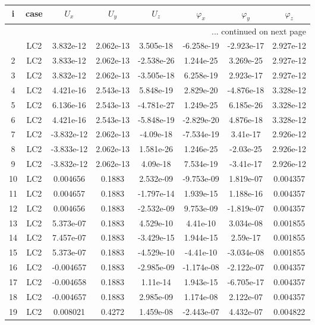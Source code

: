 \documentclass{article}%
\begin{document}
\begin{longtable}{| c c | c c c c c c |}%
\hline%
i&case&$U_x$&$U_y$&$U_z$&$\varphi_x$&$\varphi_y$&$\varphi_z$\\%
\hline%
\endhead%
\hline%
\multicolumn{8}{r}{... continued on next page}\\%
\endfoot%
\hline%
\endlastfoot%
1&LC2&3.832e{-}12&2.062e{-}13&3.505e{-}18&{-}6.258e{-}19&{-}2.923e{-}17&2.927e{-}12\\%
2&LC2&3.833e{-}12&2.062e{-}13&{-}2.538e{-}26&1.244e{-}25&3.269e{-}25&2.927e{-}12\\%
3&LC2&3.832e{-}12&2.062e{-}13&{-}3.505e{-}18&6.258e{-}19&2.923e{-}17&2.927e{-}12\\%
4&LC2&4.421e{-}16&2.543e{-}13&5.848e{-}19&2.829e{-}20&{-}4.876e{-}18&3.328e{-}12\\%
5&LC2&6.136e{-}16&2.543e{-}13&{-}4.781e{-}27&1.249e{-}25&6.185e{-}26&3.328e{-}12\\%
6&LC2&4.421e{-}16&2.543e{-}13&{-}5.848e{-}19&{-}2.829e{-}20&4.876e{-}18&3.328e{-}12\\%
7&LC2&{-}3.832e{-}12&2.062e{-}13&{-}4.09e{-}18&{-}7.534e{-}19&3.41e{-}17&2.926e{-}12\\%
8&LC2&{-}3.833e{-}12&2.062e{-}13&1.581e{-}26&1.246e{-}25&{-}2.03e{-}25&2.926e{-}12\\%
9&LC2&{-}3.832e{-}12&2.062e{-}13&4.09e{-}18&7.534e{-}19&{-}3.41e{-}17&2.926e{-}12\\%
10&LC2&0.004656&0.1883&2.532e{-}09&{-}9.753e{-}09&1.819e{-}07&0.004357\\%
11&LC2&0.004657&0.1883&{-}1.797e{-}14&1.939e{-}15&1.188e{-}16&0.004357\\%
12&LC2&0.004656&0.1883&{-}2.532e{-}09&9.753e{-}09&{-}1.819e{-}07&0.004357\\%
13&LC2&5.373e{-}07&0.1883&4.529e{-}10&4.41e{-}10&3.034e{-}08&0.001855\\%
14&LC2&7.457e{-}07&0.1883&{-}3.429e{-}15&1.944e{-}15&2.59e{-}17&0.001855\\%
15&LC2&5.373e{-}07&0.1883&{-}4.529e{-}10&{-}4.41e{-}10&{-}3.034e{-}08&0.001855\\%
16&LC2&{-}0.004657&0.1883&{-}2.985e{-}09&{-}1.174e{-}08&{-}2.122e{-}07&0.004357\\%
17&LC2&{-}0.004658&0.1883&1.11e{-}14&1.943e{-}15&{-}6.705e{-}17&0.004357\\%
18&LC2&{-}0.004657&0.1883&2.985e{-}09&1.174e{-}08&2.122e{-}07&0.004357\\%
19&LC2&0.008021&0.4272&1.459e{-}08&{-}2.443e{-}07&4.432e{-}07&0.004822\\%

\end{longtable}
\end{document}

